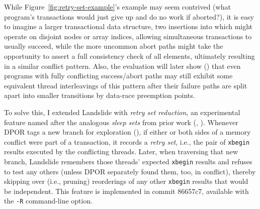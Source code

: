 While Figure~\ref{fig:retry-set-example}'s example may seem contrived
(what program's transactions would just give up and do no work if aborted?),
it is easy to imagine a larger transactional data structure,
two insertions into which might operate on disjoint nodes or array indices,
allowing simultaneous transactions to usually succeed,
while the more uncommon abort paths might take the opportunity to assert a full consistency check of all elements,
ultimately resulting in a similar conflict pattern.
Also, the evaluation will later show
(\sect{\ref{sec:tm-eval-retrysets}})
that even programs with fully conflicting success/abort paths
may still exhibit some equivalent thread interleavings of this pattern
after their failure paths are split apart into smaller transitions by data-race preemption points.

To solve this,
I extended Landslide
with {\em retry set reduction},
an experimental feature named after the analogous {\em sleep sets} from prior work
(\cite{partial-order-methods,dpor,optimal-dpor}, \sect{\ref{sec:landslide-sleepsets}}).
Whenever DPOR tags a new branch for exploration (\sect{\ref{sec:landslide-explore}}),
if either or both sides of a memory conflict were part of a transaction,
it records a {\em retry set},
i.e., the pair of {\tt xbegin} results executed by the conflicting threads.
Later, when traversing that new branch,
Landslide remembers those threads' expected {\tt xbegin} results
and refuses to test any others
(unless DPOR separately found them, too, in conflict),
thereby skipping over (i.e., pruning) reorderings of any other {\tt xbegin} results that would be independent.
This feature is implemented in commit 86657c7,
available with the {\tt -R} command-line option.


